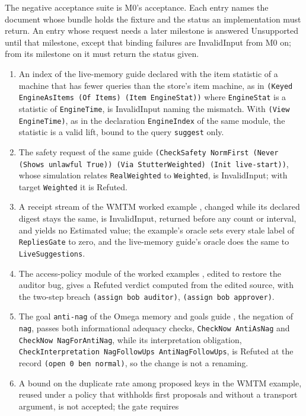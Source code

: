 \documentclass[11pt]{article}
\newcommand{\code}[1]{\texttt{#1}}
\begin{document}
The negative acceptance suite is M0's acceptance. Each entry names the document whose bundle holds
the fixture and the status an implementation must return. An entry whose request needs a later
milestone is answered Unsupported until that milestone, except that binding failures are
InvalidInput from M0 on; from its milestone on it must return the status given.
\begin{enumerate}
\item An index of the live-memory guide \cite{livememory} declared with the item statistic of a
machine that has fewer queries than the store's item machine, as in
\code{(Keyed EngineAsItems (Of Items) (Item EngineStat))} where \code{EngineStat} is a statistic of
\code{EngineTime}, is InvalidInput naming the mismatch. With \code{(View EngineTime)}, as in the
declaration \code{EngineIndex} of the same module, the statistic is a valid lift, bound to the query
\code{suggest} only.
\item The safety request of the same guide
\code{(CheckSafety NormFirst (Never (Shows unlawful True)) (Via StutterWeighted) (Init live-start))},
whose simulation relates \code{RealWeighted} to \code{Weighted}, is InvalidInput; with target
\code{Weighted} it is Refuted.
\item A receipt stream of the WMTM worked example \cite{wmtmexample}, changed while its declared
digest stays the same, is InvalidInput, returned before any count or interval, and yields no
Estimated value; the example's oracle sets every stale label of \code{RepliesGate} to zero, and the
live-memory guide's oracle does the same to \code{LiveSuggestions}.
\item The access-policy module of the worked examples \cite{worked}, edited to restore the auditor
bug, gives a Refuted verdict computed from the edited source, with the two-step breach
\code{(assign bob auditor)}, \code{(assign bob approver)}.
\item The goal \code{anti-nag} of the Omega memory and goals guide \cite{memgoals}, the negation of
\code{nag}, passes both informational adequacy checks, \code{CheckNow AntiAsNag} and
\code{CheckNow NagForAntiNag}, while its interpretation obligation,
\code{CheckInterpretation NagFollowUps AntiNagFollowUps}, is Refuted at the record
\code{(open 0 ben normal)}, so the change is not a renaming.
\item A bound on the duplicate rate among proposed keys in the WMTM example, reused under a policy
that withholds first proposals and without a transport argument, is not accepted; the gate requires

\end{enumerate}
\end{document}
